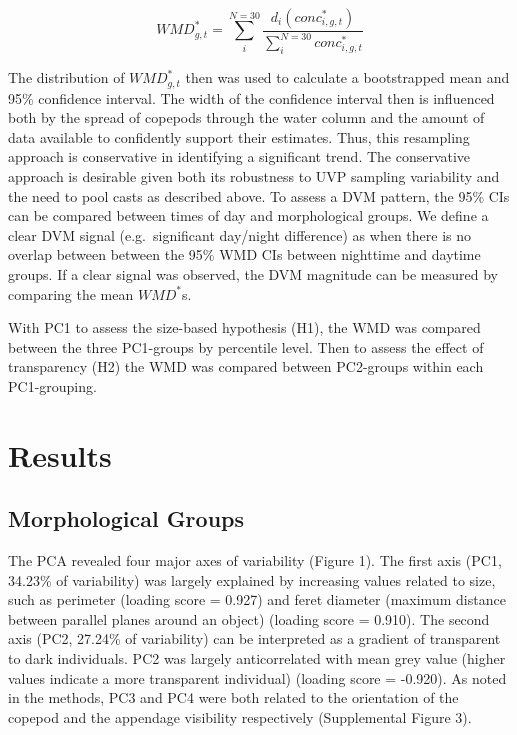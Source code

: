 \documentclass[
]{article}
\begin{document}
\[WMD^*_{g,t} = \sum_{i}^{N = 30}{\frac{d_i(conc^*_{i,g,t})}{\sum_i^{N = 30}{conc^*_{i,g,t}}}}\]

The distribution of \(WMD^*_{g,t}\) then was used to calculate a
bootstrapped mean and 95\% confidence interval. The width of the
confidence interval then is influenced both by the spread of copepods
through the water column and the amount of data available to confidently
support their estimates. Thus, this resampling approach is conservative
in identifying a significant trend. The conservative approach is
desirable given both its robustness to UVP sampling variability and the
need to pool casts as described above. To assess a DVM pattern, the 95\%
CIs can be compared between times of day and morphological groups. We
define a clear DVM signal (e.g.~significant day/night difference) as
when there is no overlap between between the 95\% WMD CIs between
nighttime and daytime groups. If a clear signal was observed, the DVM
magnitude can be measured by comparing the mean \(WMD^*\)s.

With PC1 to assess the size-based hypothesis (H1), the WMD was compared
between the three PC1-groups by percentile level. Then to assess the
effect of transparency (H2) the WMD was compared between PC2-groups
within each PC1-grouping.

\hypertarget{results}{%
\section{Results}\label{results}}

\hypertarget{morphological-groups}{%
\subsection{Morphological Groups}\label{morphological-groups}}

The PCA revealed four major axes of variability (Figure 1). The first
axis (PC1, 34.23\% of variability) was largely explained by increasing
values related to size, such as perimeter (loading score = 0.927) and
feret diameter (maximum distance between parallel planes around an
object) (loading score = 0.910). The second axis (PC2, 27.24\% of
variability) can be interpreted as a gradient of transparent to dark
individuals. PC2 was largely anticorrelated with mean grey value (higher
values indicate a more transparent individual) (loading score = -0.920).
As noted in the methods, PC3 and PC4 were both related to the
orientation of the copepod and the appendage visibility respectively
(Supplemental Figure 3).
\end{document}
